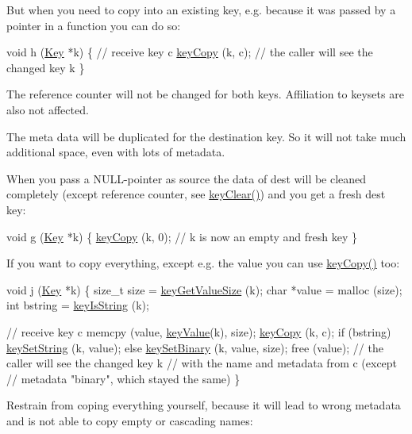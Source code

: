 But when you need to copy into an existing key, e.\+g. because it was passed by a pointer in a function you can do so\+:


\begin{DoxyCodeInclude}
\textcolor{keywordtype}{void} h (\hyperlink{classkdb_1_1Key_a5679f5cae63caddd64a60388b9cc77fa}{Key} *k)
\{
        \textcolor{comment}{// receive key c}
        \hyperlink{group__key_ga6a12cbbe656a1ad9f41b8c681d7a2f92}{keyCopy} (k, c);
        \textcolor{comment}{// the caller will see the changed key k}
\}
\end{DoxyCodeInclude}
 The reference counter will not be changed for both keys. Affiliation to keysets are also not affected.

The meta data will be duplicated for the destination key. So it will not take much additional space, even with lots of metadata.

When you pass a N\+U\+L\+L-\/pointer as source the data of dest will be cleaned completely (except reference counter, see \hyperlink{group__key_gab2242311a36bbc0520e0d36895107ec1}{key\+Clear()}) and you get a fresh dest key\+:


\begin{DoxyCodeInclude}
\textcolor{keywordtype}{void} g (\hyperlink{classkdb_1_1Key_a5679f5cae63caddd64a60388b9cc77fa}{Key} *k)
\{
        \hyperlink{group__key_ga6a12cbbe656a1ad9f41b8c681d7a2f92}{keyCopy} (k, 0);
        \textcolor{comment}{// k is now an empty and fresh key}
\}
\end{DoxyCodeInclude}
 If you want to copy everything, except e.\+g. the value you can use \hyperlink{group__key_ga6a12cbbe656a1ad9f41b8c681d7a2f92}{key\+Copy()} too\+:


\begin{DoxyCodeInclude}
\textcolor{keywordtype}{void} j (\hyperlink{classkdb_1_1Key_a5679f5cae63caddd64a60388b9cc77fa}{Key} *k)
\{
        \textcolor{keywordtype}{size\_t} size = \hyperlink{group__keyvalue_gae326672fffb7474abfe9baf53b73217e}{keyGetValueSize} (k);
        \textcolor{keywordtype}{char} *value = malloc (size);
        \textcolor{keywordtype}{int} bstring = \hyperlink{group__keytest_gaea7670778abd07fee0fe8ac12a149190}{keyIsString} (k);

        \textcolor{comment}{// receive key c}
        memcpy (value, \hyperlink{group__keyvalue_ga6f29609c5da53c6dc26a98678d5752af}{keyValue}(k), size);
        \hyperlink{group__key_ga6a12cbbe656a1ad9f41b8c681d7a2f92}{keyCopy} (k, c);
        \textcolor{keywordflow}{if} (bstring) \hyperlink{group__keyvalue_ga622bde1eb0e0c4994728331326340ef2}{keySetString} (k, value);
        \textcolor{keywordflow}{else} \hyperlink{group__keyvalue_gaa50a5358fd328d373a45f395fa1b99e7}{keySetBinary} (k, value, size);
        free (value);
        \textcolor{comment}{// the caller will see the changed key k}
        \textcolor{comment}{// with the name and metadata from c (except}
        \textcolor{comment}{// metadata "binary", which stayed the same)}
\}
\end{DoxyCodeInclude}
 Restrain from coping everything yourself, because it will lead to wrong metadata and is not able to copy empty or cascading names\+:


